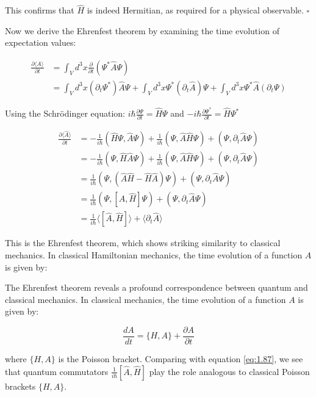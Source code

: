 This confirms that $\hat{H}$ is indeed Hermitian, as required for a physical observable. $\square$

Now we derive the Ehrenfest theorem by examining the time evolution of expectation values:

\begin{align}
\frac{\partial\langle\hat{A}\rangle}{\partial t} &= \int_V d^3x\frac{\partial}{\partial t}(\Psi^*\hat{A}\Psi) \\
&= \int_V d^3x(\partial_t\Psi^*)\hat{A}\Psi + \int_V d^3x\Psi^*(\partial_t\hat{A})\Psi + \int_V d^3x\Psi^*\hat{A}(\partial_t\Psi)
\end{align}

Using the Schrödinger equation:
$i\hbar\frac{\partial\Psi}{\partial t} = \hat{H}\Psi$ and $-i\hbar\frac{\partial\Psi^*}{\partial t} = \hat{H}\Psi^*$

\begin{align}
\frac{\partial\langle\hat{A}\rangle}{\partial t} &= -\frac{1}{i\hbar}(\hat{H}\Psi, \hat{A}\Psi) + \frac{1}{i\hbar}(\Psi, \hat{A}\hat{H}\Psi) + (\Psi, \partial_t\hat{A}\Psi) \\
&= -\frac{1}{i\hbar}(\Psi, \hat{H}\hat{A}\Psi) + \frac{1}{i\hbar}(\Psi, \hat{A}\hat{H}\Psi) + (\Psi, \partial_t\hat{A}\Psi) \\
&= \frac{1}{i\hbar}(\Psi, (\hat{A}\hat{H} - \hat{H}\hat{A})\Psi) + (\Psi, \partial_t\hat{A}\Psi) \label{eq:1.87} \\
&= \frac{1}{i\hbar}(\Psi, [\hat{A}, \hat{H}]\Psi) + (\Psi, \partial_t\hat{A}\Psi) \\
&= \frac{1}{i\hbar}\langle[\hat{A}, \hat{H}]\rangle + \langle\partial_t\hat{A}\rangle
\end{align}

This is the Ehrenfest theorem, which shows striking similarity to classical mechanics. In classical Hamiltonian mechanics, the time evolution of a function $A$ is given by:


The Ehrenfest theorem reveals a profound correspondence between quantum and classical mechanics. In classical mechanics, the time evolution of a function $A$ is given by:

\begin{equation}
\frac{dA}{dt} = \{H,A\} + \frac{\partial A}{\partial t}
\end{equation}

where $\{H,A\}$ is the Poisson bracket. Comparing with equation \eqref{eq:1.87}, we see that quantum commutators $\frac{1}{i\hbar}[\hat{A},\hat{H}]$ play the role analogous to classical Poisson brackets $\{H,A\}$.

